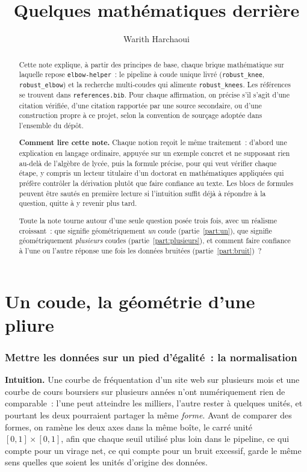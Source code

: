 \documentclass[11pt]{article}
\title{Quelques mathématiques derrière \code{elbow-helper}}
\author{Warith Harchaoui}
\date{}
\newcommand{\code}[1]{\texttt{#1}}
\begin{document}
\maketitle

\begin{abstract}
Cette note explique, à partir des principes de base, chaque brique
mathématique sur laquelle repose \code{elbow-helper}~: le pipeline à coude
unique livré (\code{robust\_knee}, \code{robust\_elbow}) et la recherche
multi-coudes qui alimente \code{robust\_knees}. Les références se trouvent
dans \code{references.bib}. Pour chaque affirmation, on précise s'il s'agit
d'une citation vérifiée, d'une citation rapportée par une source secondaire,
ou d'une construction propre à ce projet, selon la convention de sourçage
adoptée dans l'ensemble du dépôt.

\textbf{Comment lire cette note.} Chaque notion reçoit le même traitement~:
d'abord une explication en langage ordinaire, appuyée sur un exemple
concret et ne supposant rien au-delà de l'algèbre de lycée, puis la formule
précise, pour qui veut vérifier chaque étape, y compris un lecteur
titulaire d'un doctorat en mathématiques appliquées qui préfère contrôler
la dérivation plutôt que faire confiance au texte. Les blocs de formules
peuvent être sautés en première lecture si l'intuition suffit déjà à
répondre à la question, quitte à y revenir plus tard.

Toute la note tourne autour d'une seule question posée trois fois, avec un
réalisme croissant~: que signifie géométriquement \emph{un} coude
(partie~\ref{part:un}), que signifie géométriquement \emph{plusieurs}
coudes (partie~\ref{part:plusieurs}), et comment faire confiance à l'une ou
l'autre réponse une fois les données bruitées (partie~\ref{part:bruit})~?
\end{abstract}

\tableofcontents

\part{Un coude, la géométrie d'une pliure}
\label{part:un}

\section{Mettre les données sur un pied d'égalité~: la normalisation}

\textbf{Intuition.} Une courbe de fréquentation d'un site web sur plusieurs
mois et une courbe de cours boursiers sur plusieurs années n'ont
numériquement rien de comparable~: l'une peut atteindre les milliers,
l'autre rester à quelques unités, et pourtant les deux pourraient partager
la même \emph{forme}. Avant de comparer des formes, on ramène les deux axes
dans la même boîte, le carré unité $[0,1] \times [0,1]$, afin que chaque
seuil utilisé plus loin dans le pipeline, ce qui compte pour un virage net,
ce qui compte pour un bruit excessif, garde le même sens quelles que soient
les unités d'origine des données.
\end{document}
